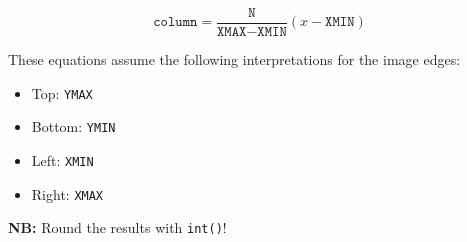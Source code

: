 \documentclass{lab}
\begin{document}
\begin{equation}
\texttt{column} = \frac{\texttt{N}}{\texttt{XMAX}-\texttt{XMIN}}(x-\texttt{XMIN}) 
\end{equation}

These equations assume the following interpretations for the image edges:

\begin{itemize}
\item Top: \texttt{YMAX}
\item Bottom: \texttt{YMIN}
\item Left: \texttt{XMIN}
\item Right: \texttt{XMAX}
\end{itemize}

\textbf{NB:} Round the results with \texttt{int()}!
\end{document}
